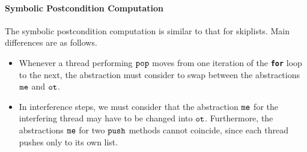 



\paragraph{{\bf Symbolic Postcondition Computation}}
The symbolic postcondition computation is similar to that for skiplists.
Main differences are as follows.
\begin{itemize}
\item
  Whenever a thread performing $\tt pop$ moves from one iteration of the
  {\bf\tt for} loop to the next, the abstraction must consider
  to swap between the abstractions $\tt me$ and $\tt ot$.
  \item
    In interference steps, we must consider that the abstraction
    $\tt me$ for the interfering thread may have to be changed into $\tt ot$.
    Furthermore, the abstractions $\tt me$ for two $\tt push$ methods
    cannot coincide, since each thread pushes only to its own list.
\end{itemize}

